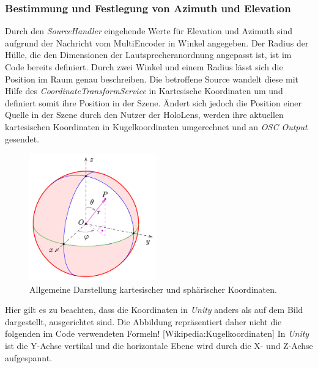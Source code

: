 \documentclass[11pt, titlepage, fleqn]{report}
\begin{document}
                \subsubsection{Bestimmung und Festlegung von Azimuth und Elevation}
                    Durch den \textit{SourceHandler} eingehende Werte für Elevation und Azimuth sind aufgrund der Nachricht vom 
                    MultiEncoder in Winkel angegeben. Der Radius der Hülle, die 
                    den Dimensionen der Lautsprecheranordnung angepasst ist, 
                    ist im Code 
                    bereits definiert. Durch zwei Winkel und einem Radius lässt sich die Position im Raum genau beschreiben. 
                    Die betroffene Source wandelt diese mit Hilfe des \textit{CoordinateTransformService} in Kartesische 
                    Koordinaten um und definiert somit ihre Position in der 
                    Szene. Ändert sich jedoch die Position einer Quelle in der 
                    Szene durch den Nutzer der HoloLens, werden ihre aktuellen 
                    kartesischen Koordinaten in Kugelkoordinaten umgerechnet und an \textit{OSC Output} gesendet.
                    \begin{figure}
                        \includegraphics[height=5.5cm]{./img/kugel.png}
                        \caption[Allgemeine Darstellung kartesischer und sphärischer Koordinaten.]
                        {Allgemeine Darstellung kartesischer und sphärischer 
                        Koordinaten.\label{fig:kugel}}
                    \end{figure}\linebreak
                    \fussy Hier gilt es zu beachten, dass die Koordinaten in \textit{Unity} anders als auf dem Bild dargestellt, 
                    ausgerichtet sind. Die Abbildung repräsentiert daher nicht 
                    die folgenden im Code verwendeten Formeln! 
                    [Wikipedia:Kugelkoordinaten\cite{Kugel}]
                    In \textit{Unity} ist die Y-Achse vertikal und die horizontale Ebene wird durch die X- und Z-Achse aufgespannt.
\end{document}
